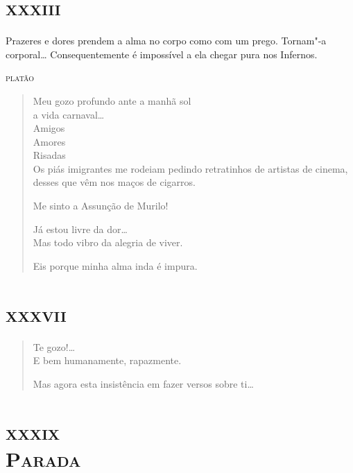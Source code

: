 \chapter[\textsc{xxxiii}\ \ ``Meu gozo profundo ante a manhã sol'']{\textsc{xxxiii}}

\epigraph{Prazeres e dores prendem a alma no corpo como com um prego. Tornam"-a
corporal\ldots{} Consequentemente é impossível a ela chegar pura nos
Infernos.}{\textsc{platão}}

\begin{verse}
Meu gozo profundo ante a manhã sol\\
\qquad\qquad\qquad\qquad{}a vida carnaval\ldots{}\\
\qquad\qquad\qquad\qquad{}Amigos\\
\qquad\qquad\qquad{}Amores\\
\qquad\qquad{}Risadas\\
Os piás imigrantes me rodeiam pedindo retratinhos de artistas de cinema,
desses que vêm nos maços de cigarros.

Me sinto a Assunção de Murilo!

Já estou livre da dor\ldots{}\\
Mas todo vibro da alegria de viver.

\quad{}Eis porque minha alma inda é impura.
\end{verse}

\chapter[\textsc{xxxvii}\ \ ``Te gozo!\ldots{}'']{\textsc{xxxvii}}

\begin{verse}
Te gozo!\ldots{}\\
E bem humanamente, rapazmente.

Mas agora esta insistência em fazer versos sobre ti\ldots{}
\end{verse}

\chapter[\textsc{xxxix}\ \ \textsc{Parada}]{\textsc{xxxix}\\\textsc{Parada} }

